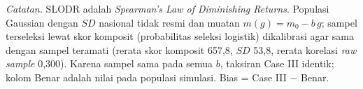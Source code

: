 \begin{table}[H]
    \centering
    \caption{Kinerja Koreksi Thorndike Case III pada Populasi Simulasi dengan Korelasi yang Menurun pada Skor Tinggi (SLODR)}
    \label{tab:slodr_case3}
    \begin{spacing}{1.0}
    \end{spacing}
    \vspace{2mm}
    \begin{flushleft}
    \footnotesize\textit{Catatan.} SLODR adalah \textit{Spearman's Law of Diminishing Returns}. Populasi Gaussian dengan $SD$ nasional tidak resmi dan muatan $m(g) = m_0 - b\,g$; sampel terseleksi lewat skor komposit (probabilitas seleksi logistik) dikalibrasi agar sama dengan sampel teramati (rerata skor komposit 657,8, $SD$ 53,8, rerata korelasi \textit{raw sample} 0,300). Karena sampel sama pada semua $b$, taksiran Case III identik; kolom Benar adalah nilai pada populasi simulasi. Bias = Case III $-$ Benar.
    \end{flushleft}
\end{table}
